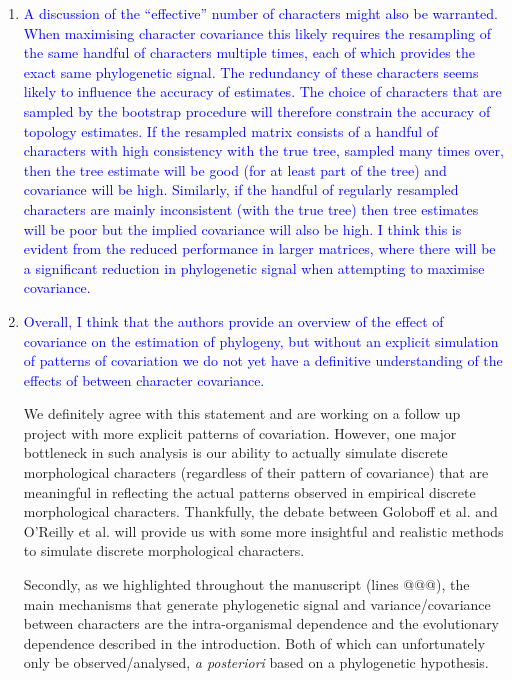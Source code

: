 \documentclass[12pt,letterpaper]{article}
\begin{document}
\begin{enumerate}
\item{\textcolor{blue}{A discussion of the ``effective'' number of characters might also be warranted. When maximising character covariance this likely requires the resampling of the same handful of characters multiple times, each of which provides the exact same phylogenetic signal. The redundancy of these characters seems likely to influence the accuracy of estimates. The choice of characters that are sampled by the bootstrap procedure will therefore constrain the accuracy of topology estimates. If the resampled matrix consists of a handful of characters with high consistency with the true tree, sampled many times over, then the tree estimate will be good (for at least part of the tree) and covariance will be high. Similarly, if the handful of regularly resampled characters are mainly inconsistent (with the true tree) then tree estimates will be poor but the implied covariance will also be high. I think this is evident from the reduced performance in larger matrices, where there will be a significant reduction in phylogenetic signal when attempting to maximise covariance.}}


\item{\textcolor{blue}{Overall, I think that the authors provide an overview of the effect of covariance on the estimation of phylogeny, but without an explicit simulation of patterns of covariation we do not yet have a definitive understanding of the effects of between character covariance.}}

We definitely agree with this statement and are working on a follow up project with more explicit patterns of covariation.
However, one major bottleneck in such analysis is our ability to actually simulate discrete morphological characters (regardless of their pattern of covariance) that are meaningful in reflecting the actual patterns observed in empirical discrete morphological characters.
Thankfully, the debate between Goloboff et al. and O'Reilly et al. will provide us with some more insightful and realistic methods to simulate discrete morphological characters.

Secondly, as we highlighted throughout the manuscript (lines @@@), the main mechanisms that generate phylogenetic signal and variance/covariance between characters are the intra-organismal dependence and the evolutionary dependence described in the introduction.
Both of which can unfortunately only be observed/analysed, \textit{a posteriori} based on a phylogenetic hypothesis.


\end{enumerate}
\end{document}

